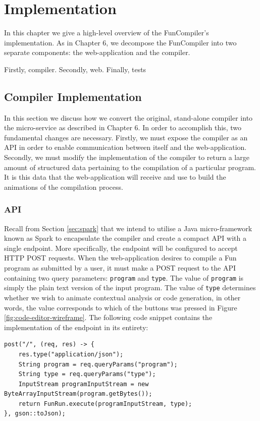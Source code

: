 \documentclass{l4proj}
\begin{document}
\chapter{Implementation}
In this chapter we give a high-level overview of the FunCompiler's implementation. As in Chapter 6, we decompose the FunCompiler into two separate components: the web-application and the compiler. 

Firstly, compiler. Secondly, web. Finally, tests

\section{Compiler Implementation}
In this section we discuss how we convert the original, stand-alone compiler into the micro-service as described in Chapter 6.  In order to accomplish this, two fundamental changes are necessary. Firstly, we must expose the compiler as an API in order to enable communication between itself and the web-application. Secondly, we must modify the implementation of the compiler to return a large amount of structured data pertaining to the compilation of a particular program. It is this data that the web-application will receive and use to build the animations of the compilation process.

\subsection{API}
Recall from Section \ref{sec:spark} that we intend to utilise a Java micro-framework known as Spark to encapsulate the compiler and create a compact API with a single endpoint. More specifically, the endpoint will be configured to accept HTTP POST requests. When the web-application desires to compile a Fun program as submitted by a user, it must make a POST request to the API containing two query parameters: \texttt{program} and \texttt{type}. The value of \texttt{program} is simply the plain text version of the input program. The value of \texttt{type} determines whether we wish to animate contextual analysis or code generation, in other words, the value corresponds to which of the buttons was pressed in Figure \ref{fig:code-editor-wireframe}. The following code snippet contains the implementation of the endpoint in its entirety:
\begin{lstlisting}
post("/", (req, res) -> {
	res.type("application/json");
	String program = req.queryParams("program");
 	String type = req.queryParams("type");
	InputStream programInputStream = new ByteArrayInputStream(program.getBytes());
	return FunRun.execute(programInputStream, type);
}, gson::toJson);
\end{lstlisting} 
\end{document}
